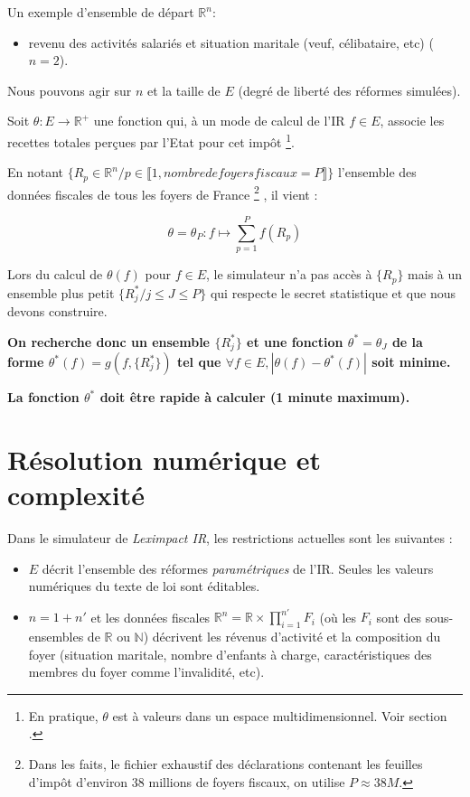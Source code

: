 \documentclass[12pt]{article}
\begin{document}
Un exemple d'ensemble de départ $\mathbb{R}^n$:
\begin{itemize}
  \item revenu des activités salariés et situation maritale (veuf, célibataire, etc) ($n=2$).
\end{itemize}

Nous pouvons agir sur $n$ et la taille de $E$ (degré de liberté des réformes simulées).
\newline

Soit $\theta: E \longrightarrow \mathbb{R}^+$ une fonction qui,
à un mode de calcul de l'IR $f \in E$, associe
les recettes totales perçues par l'Etat pour cet impôt
\footnote{En pratique, $\theta$ est à valeurs dans un espace multidimensionnel.
Voir section .}.
\newline

En notant $\{ R_p \in \mathbb{R}^n / p \in  \llbracket 1, nombre de foyers fiscaux = P \rrbracket  \}$
l'ensemble des données fiscales de tous les foyers de France
\footnote{Dans les faits, le fichier exhaustif des déclarations contenant les feuilles d'impôt
d'environ 38 millions de foyers fiscaux, on utilise $P \approx 38M$.}
, il vient :

\begin{displaymath}
\theta = \theta_{P}: f \longmapsto \sum_{p=1}^{P} f(R_p)
\end{displaymath}

Lors du calcul de $\theta(f)$ pour $f \in E$, le simulateur n'a pas accès à $\{ R_p \}$ mais
à un ensemble plus petit $\{ R^*_j / j \leq J \leq P \}$ qui respecte le secret statistique et
que nous devons construire.
\newline

\textbf{On recherche donc un ensemble $\{ R^*_j \}$ et une fonction $\theta^{*}=\theta_J$
de la forme $\theta^{*}(f)=g(f, \{ R^*_j \})$ tel que $\forall f \in E, |\theta(f) - \theta^*(f)|$ soit minime.}
\newline

\textbf{La fonction $\theta^*$ doit être rapide à calculer (1 minute maximum).}

\section{Résolution numérique et complexité}

Dans le simulateur de \emph{Leximpact IR}, les restrictions actuelles sont les suivantes :

\begin{itemize}
  \item $E$ décrit l'ensemble des réformes \emph{paramétriques} de l'IR. Seules les valeurs
  numériques du texte de loi sont éditables.
  \item $n=1+n'$ et les données fiscales $\mathbb{R}^n=\mathbb{R}\times\prod_{i=1}^{n'} F_i$
  (où les $F_i$ sont des sous-ensembles de $\mathbb{R}$ ou $\mathbb{N}$) décrivent les révenus d'activité et la
  composition du foyer (situation maritale, nombre d'enfants à charge, caractéristiques des membres du foyer
  comme l'invalidité, etc).
\end{itemize}
\end{document}
